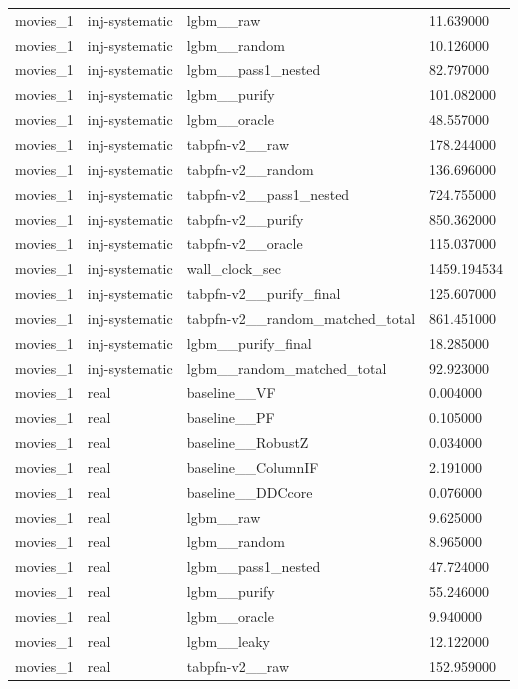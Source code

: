 \begin{tabular}{llll}
movies\_1 & inj-systematic & lgbm\_\_raw & 11.639000 \\
movies\_1 & inj-systematic & lgbm\_\_random & 10.126000 \\
movies\_1 & inj-systematic & lgbm\_\_pass1\_nested & 82.797000 \\
movies\_1 & inj-systematic & lgbm\_\_purify & 101.082000 \\
movies\_1 & inj-systematic & lgbm\_\_oracle & 48.557000 \\
movies\_1 & inj-systematic & tabpfn-v2\_\_raw & 178.244000 \\
movies\_1 & inj-systematic & tabpfn-v2\_\_random & 136.696000 \\
movies\_1 & inj-systematic & tabpfn-v2\_\_pass1\_nested & 724.755000 \\
movies\_1 & inj-systematic & tabpfn-v2\_\_purify & 850.362000 \\
movies\_1 & inj-systematic & tabpfn-v2\_\_oracle & 115.037000 \\
movies\_1 & inj-systematic & wall\_clock\_sec & 1459.194534 \\
movies\_1 & inj-systematic & tabpfn-v2\_\_purify\_final & 125.607000 \\
movies\_1 & inj-systematic & tabpfn-v2\_\_random\_matched\_total & 861.451000 \\
movies\_1 & inj-systematic & lgbm\_\_purify\_final & 18.285000 \\
movies\_1 & inj-systematic & lgbm\_\_random\_matched\_total & 92.923000 \\
movies\_1 & real & baseline\_\_VF & 0.004000 \\
movies\_1 & real & baseline\_\_PF & 0.105000 \\
movies\_1 & real & baseline\_\_RobustZ & 0.034000 \\
movies\_1 & real & baseline\_\_ColumnIF & 2.191000 \\
movies\_1 & real & baseline\_\_DDCcore & 0.076000 \\
movies\_1 & real & lgbm\_\_raw & 9.625000 \\
movies\_1 & real & lgbm\_\_random & 8.965000 \\
movies\_1 & real & lgbm\_\_pass1\_nested & 47.724000 \\
movies\_1 & real & lgbm\_\_purify & 55.246000 \\
movies\_1 & real & lgbm\_\_oracle & 9.940000 \\
movies\_1 & real & lgbm\_\_leaky & 12.122000 \\
movies\_1 & real & tabpfn-v2\_\_raw & 152.959000 \\

\end{tabular}
